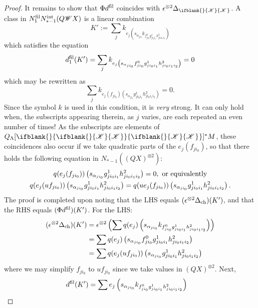 \documentclass[10pt]{article}
\newcommand{\LL}[1]{\ifblank{#1}{\scrK}{\scrK^{#1}}}
\newcommand{\Fr}[2][]{\ifblank{#1}{#2}{#2_{#1}}}
\begin{document}
\begin{Grothendieck Multiplicativity}
\begin{proof}
It remains to show that $\Phi\circ d^\textup{fil}$ coincides with $\epsilon^{\otimes 2}\circ\Delta_{\LL{}}$. A class in $N_1^\textup{fil}N_{*-1}^\textup{int}(Q\scrW X)$ is a linear combination
\[K':=\sum_j k_{e_j\left(s_{\alpha_{ji_0}} k_{f^0_{ji_0}g^1_{ji_0i_1}h^2_{ji_0i_1i_2}}\right)}\]
which satisfies the equation
\[d_1^\textup{fil}(K')=\sum_j k_{e_j\left(s_{\alpha_{ji_0}} {f^0_{ji_0}g^1_{ji_0i_1}h^2_{ji_0i_1i_2}}\right)}=0\]
which may be rewritten as
\[\sum_j k_{e_j(f_{ji_0})\left(s_{\alpha_{ji_0}} {g^1_{ji_0i_1}h^2_{ji_0i_1i_2}}\right)}=0.\]
Since the symbol $k$ is used in this condition, it is \emph{very} strong. It can only hold when, the subscripts appearing therein, as $j$ varies, are each repeated an even number of times! As the subscripts are elements of $Q_{\Lambda}[\Fr{\LL{}}]^{*}M$, these coincidences also occur if we take quadratic parts of the $e_j(f_{ji_0})$, so that there holds the following equation in $N_{*-1}((QX)^{\otimes2})$:
\begin{gather*}
q(e_j(f_{ji_0}))\left(s_{\alpha_{ji_0}} {g^1_{ji_0i_1}h^2_{ji_0i_1i_2}}\right)=0,\textup{ or equivalently}\\
q(e_j(uf_{ji_0}))\left(s_{\alpha_{ji_0}} {g^1_{ji_0i_1}h^2_{ji_0i_1i_2}}\right)
=
q(ue_j(f_{ji_0}))\left(s_{\alpha_{ji_0}} {g^1_{ji_0i_1}h^2_{ji_0i_1i_2}}\right).
\end{gather*}
The proof is completed upon noting that the LHS equals $(\epsilon^{\otimes 2}\circ \Delta_\textup{ch})(K')$, and that the RHS equals $(\Phi\circ d^\textup{fil})(K')$. For the LHS:
\begin{alignat*}{2}
(\epsilon^{\otimes 2}\circ \Delta_\textup{ch})(K')
&=
\epsilon^{\otimes 2}\left(\sum q(e_j)\left(s_{\alpha_{ji_0}} k_{f^0_{ji_0}g^1_{ji_0i_1}h^2_{ji_0i_1i_2}}\right)\right)%
\\
&=
\sum q(e_j)\left(s_{\alpha_{ji_0}} f^0_{ji_0}g^1_{ji_0i_1}h^2_{ji_0i_1i_2}\right)%
\\
&=
\sum q(e_j(uf_{ji_0}))\left(s_{\alpha_{ji_0}} g^1_{ji_0i_1}h^2_{ji_0i_1i_2}\right)
\end{alignat*}
where we may simplify $f_{ji_0}$ to $uf_{ji_0}$ since we take values in $(QX)^{\otimes2}$. Next,
\begin{alignat*}{2}
d^\textup{fil}(K')
&=
\sum e_j\left(s_{\alpha_{ji_0}} k_{f^0_{ji_0}g^1_{ji_0i_1}h^2_{ji_0i_1i_2}}\right)%

\end{alignat*}
\end{proof}
\end{Grothendieck Multiplicativity}
\end{document}
